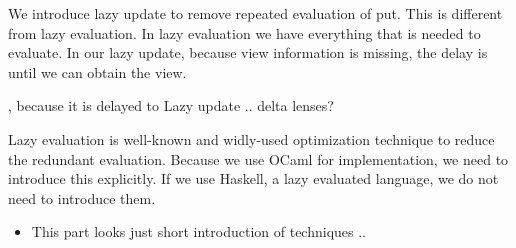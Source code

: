 We introduce lazy update to remove repeated evaluation of put. This is different from lazy evaluation. In lazy evaluation we have everything that is needed to evaluate. In our lazy update, because view information is missing, the delay is until we can obtain the view. 


, because it is delayed to 
Lazy update .. delta lenses?

Lazy evaluation \cite{} is well-known and widly-used optimization technique to reduce the redundant evaluation. Because we use OCaml for implementation, we need to introduce this explicitly. If we use Haskell, a lazy evaluated language, we do not need to introduce them.

\begin{itemize}
\item This part looks just short introduction of  techniques .. 
\end{itemize}


